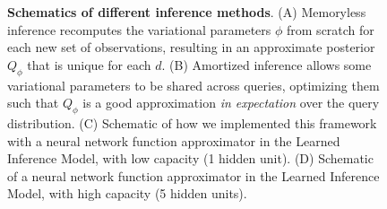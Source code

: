 \begin{figure}
\captionsetup[subfigure]{justification=centering}
\centering
    
\caption{\textbf{Schematics of different inference methods}. (A) Memoryless inference recomputes the variational parameters $\phi$ from scratch for each new set of observations, resulting in an approximate posterior $Q_\phi$ that is unique for each $d$. (B) Amortized inference allows some variational parameters to be shared across queries, optimizing them such that $Q_\phi$ is a good approximation \emph{in expectation} over the query distribution. (C) Schematic of how we implemented this framework with a neural network function approximator in the Learned Inference Model, with low capacity (1 hidden unit). (D) Schematic of a neural network function approximator in the Learned Inference Model, with high capacity (5 hidden units).} 
  \label{fig:amo_schematic}
\end{figure}

